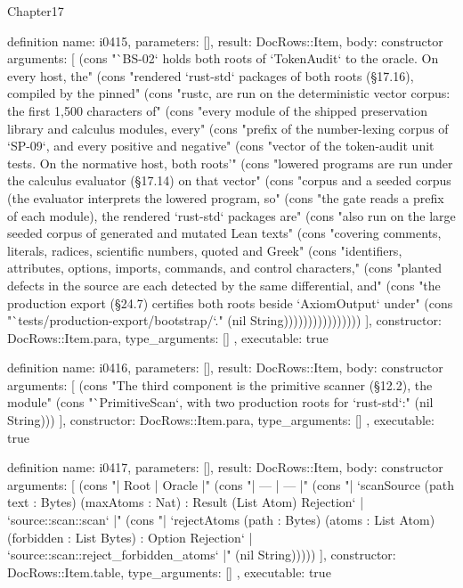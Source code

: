 \begin{lexlean}{Chapter17}
\begin{semanticmodule}
definition{
  name: i0415,
  parameters: [],
  result: DocRows::Item,
  body: constructor{
    arguments: [
      (cons "`BS-02` holds both roots of `TokenAudit` to the oracle. On every host, the" (cons "rendered `rust-std` packages of both roots (§17.16), compiled by the pinned" (cons "rustc, are run on the deterministic vector corpus: the first 1,500 characters of" (cons "every module of the shipped preservation library and calculus modules, every" (cons "prefix of the number-lexing corpus of `SP-09`, and every positive and negative" (cons "vector of the token-audit unit tests. On the normative host, both roots'" (cons "lowered programs are run under the calculus evaluator (§17.14) on that vector" (cons "corpus and a seeded corpus (the evaluator interprets the lowered program, so" (cons "the gate reads a prefix of each module), the rendered `rust-std` packages are" (cons "also run on the large seeded corpus of generated and mutated Lean texts" (cons "covering comments, literals, radices, scientific numbers, quoted and Greek" (cons "identifiers, attributes, options, imports, commands, and control characters," (cons "planted defects in the source are each detected by the same differential, and" (cons "the production export (§24.7) certifies both roots beside `AxiomOutput` under" (cons "`tests/production-export/bootstrap/`." (nil String))))))))))))))))
    ],
    constructor: DocRows::Item.para,
    type_arguments: []
  },
  executable: true
}

definition{
  name: i0416,
  parameters: [],
  result: DocRows::Item,
  body: constructor{
    arguments: [
      (cons "The third component is the primitive scanner (§12.2), the module" (cons "`PrimitiveScan`, with two production roots for `rust-std`:" (nil String)))
    ],
    constructor: DocRows::Item.para,
    type_arguments: []
  },
  executable: true
}

definition{
  name: i0417,
  parameters: [],
  result: DocRows::Item,
  body: constructor{
    arguments: [
      (cons "| Root | Oracle |" (cons "| --- | --- |" (cons "| `scanSource (path text : Bytes) (maxAtoms : Nat) : Result (List Atom) Rejection` | `source::scan::scan` |" (cons "| `rejectAtoms (path : Bytes) (atoms : List Atom) (forbidden : List Bytes) : Option Rejection` | `source::scan::reject_forbidden_atoms` |" (nil String)))))
    ],
    constructor: DocRows::Item.table,
    type_arguments: []
  },
  executable: true
}


\end{semanticmodule}
\end{lexlean}
